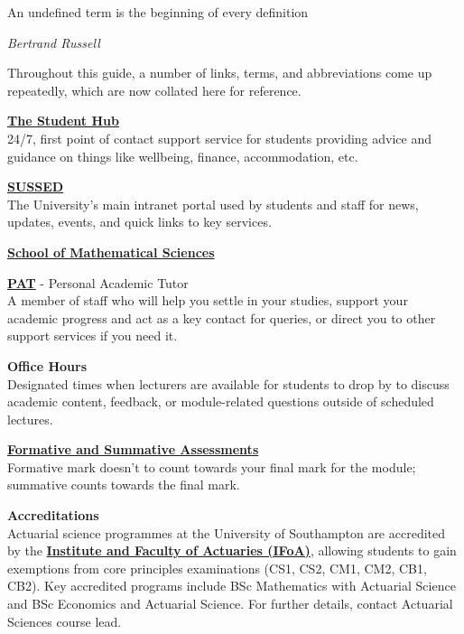 \epigraph{An undefined term is the beginning of every definition}
{\textit{Bertrand Russell}}

Throughout this guide, a number of links, terms, and abbreviations come up repeatedly, which are now collated here for reference. 

\textbf{\href{https://www.southampton.ac.uk/studentservices/index.page}{The Student Hub}} \\
24/7, first point of contact support service for students providing advice and guidance on things like wellbeing, finance, accommodation, etc. 

\textbf{\href{https://sotonac.sharepoint.com/}{SUSSED}} \\
The University's main intranet portal used by students and staff for news, updates, events, and quick links to key services. 

\textbf{\href{https://www.southampton.ac.uk/about/faculties-schools-departments/school-of-mathematical-sciences}{School of Mathematical Sciences}} 

\textbf{\href{https://www.southampton.ac.uk/studentadmin/academic-support-guidance/personal-tutor.page}{PAT}} - Personal Academic Tutor \\  
A member of staff who will help you settle in your studies, support your academic progress and act as a key contact for queries, or direct you to other support services if you need it. 

\textbf{Office Hours}\\
Designated times when lecturers are available for students to drop by to discuss academic content, feedback, or module-related questions outside of scheduled lectures. 

\textbf{\href{https://library.soton.ac.uk/feedback/types}{Formative and Summative Assessments}}\\
Formative mark doesn’t to count towards your final mark for the module; summative counts towards the final mark.

\textbf{Accreditations} \\
Actuarial science programmes at the University of Southampton are accredited by the \textbf{\href{https://actuaries.org.uk/}{Institute and Faculty of Actuaries (IFoA)}}, allowing students to gain exemptions from core principles examinations (CS1, CS2, CM1, CM2, CB1, CB2). Key accredited programs include BSc Mathematics with Actuarial Science and BSc Economics and Actuarial Science. For further details, contact Actuarial Sciences course lead. 

